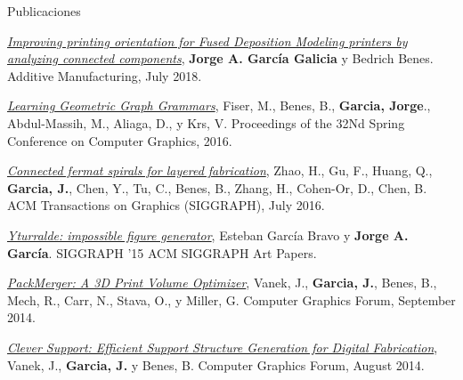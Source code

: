 \documentclass{resume} %
\begin{document}
\begin{rSection}{Publicaciones} \itemsep 1pt
\item \textit{\href{http://www.sciencedirect.com/science/article/pii/S2214860417302555}{Improving printing orientation for Fused Deposition Modeling printers by analyzing connected components}}, { \bf Jorge A. García Galicia} y Bedrich Benes. Additive Manufacturing, July 2018.
\item \textit{\href{http://dl.acm.org/doi/abs/10.1145/2948628.2948635}{Learning Geometric Graph Grammars}}, Fiser, M., Benes, B., { \bf Garcia, Jorge}., Abdul-Massih, M., Aliaga, D., y Krs, V. Proceedings of the 32Nd Spring Conference on Computer Graphics, 2016.
\item \textit{\href{http://dl.acm.org/doi/abs/10.1145/2897824.2925958}{Connected fermat spirals for layered fabrication}}, Zhao, H., Gu, F., Huang, Q., { \bf Garcia, J.}, Chen, Y., Tu, C., Benes, B., Zhang, H., Cohen-Or, D., Chen, B. ACM Transactions on Graphics (SIGGRAPH), July 2016.
\item \textit{\href{http://www.mitpressjournals.org/doi/abs/10.1162/LEON_a_01090}{Yturralde: impossible figure generator}}, Esteban García Bravo y { \bf Jorge A. García}. SIGGRAPH '15 ACM SIGGRAPH Art Papers.
\item \textit{\href{http://onlinelibrary.wiley.com/doi/abs/10.1111/cgf.12353}{PackMerger: A 3D Print Volume Optimizer}}, Vanek, J., { \bf Garcia, J.}, Benes, B., Mech, R., Carr, N., Stava, O., y Miller, G. Computer Graphics Forum, September 2014.
\item \textit{\href{http://onlinelibrary.wiley.com/doi/abs/10.1111/cgf.12437}{Clever Support: Efficient Support Structure Generation for Digital Fabrication}}, Vanek, J., { \bf Garcia, J.} y Benes, B. Computer Graphics Forum, August 2014.
\end{rSection}

\end{document}
